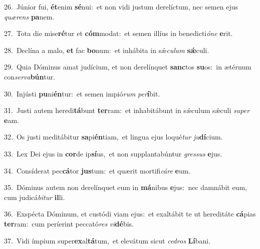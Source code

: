 {\numbfont\textcolor{\numbcolor}{26.}}~Júnior fui, \textbf{ét}\-enim \textbf{sé}\-nui:~\star et non vidi justum derelíctum, nec semen ejus \textit{quæ}\-\textit{rens} \textbf{pa}\-nem.\par
{\numbfont\textcolor{\numbcolor}{27.}}~Tota die mise\-\textbf{ré}\-tur et \textbf{cóm}\-modat:~\star et semen illíus in benedicti\-\textit{ó}\-\textit{ne} \textbf{e}\-rit.\par
{\numbfont\textcolor{\numbcolor}{28.}}~Declína a malo, \textbf{et} fac \textbf{bo}\-num:~\star et inhábita in sǽ\-\textit{cu}\-\textit{lum} \textbf{sǽ}\-culi.\par
{\numbfont\textcolor{\numbcolor}{29.}}~Quia Dóminus amat judícium, et non derelínquet \textbf{sanc}\-tos \textbf{su}\-os:~\star in ætérnum con\-\textit{ser}\-\textit{va}\textbf{bún}tur.\par
{\numbfont\textcolor{\numbcolor}{30.}}~Injústi \textbf{pu}\-ni\-\textbf{én}\-tur:~\star et semen impió\textit{rum} \textit{per}\-\textbf{í}bit.\par
{\numbfont\textcolor{\numbcolor}{31.}}~Justi autem heredi\-\textbf{tá}\-bunt \textbf{ter}\-ram:~\star et inhabitábunt in sǽculum sǽculi \textit{su}\-\textit{per} \textbf{e}\-am.\par
{\numbfont\textcolor{\numbcolor}{32.}}~Os justi meditábitur \textbf{sa}\-pi\-\textbf{én}\-tiam,~\star et lingua ejus loqué\textit{tur} \textit{ju}\-\textbf{dí}cium.\par
{\numbfont\textcolor{\numbcolor}{33.}}~Lex Dei ejus in \textbf{cor}\-de ip\-\textbf{sí}\-us,~\star et non supplantabúntur \textit{gres}\-\textit{sus} \textbf{e}\-jus.\par
{\numbfont\textcolor{\numbcolor}{34.}}~Consíderat pec\-\textbf{cá}\-tor \textbf{jus}\-tum:~\star et quærit mortifi\-\textit{cá}\-\textit{re} \textbf{e}\-um.\par
{\numbfont\textcolor{\numbcolor}{35.}}~Dóminus autem non derelínquet eum in \textbf{má}\-nibus \textbf{e}\-jus:~\star nec damnábit eum, cum judicá\-\textit{bi}\-\textit{tur} \textbf{il}\-li.\par
{\numbfont\textcolor{\numbcolor}{36.}}~Exspécta Dóminum, et custódi viam ejus:~\dagger et exaltábit te ut hereditáte \textbf{cá}\-pias \textbf{ter}\-ram:~\star cum períerint peccató\textit{res} \textit{vi}\-\textbf{dé}bis.\par
{\numbfont\textcolor{\numbcolor}{37.}}~Vidi ímpium super\-\textbf{ex}\-al\-\textbf{tá}\-tum,~\star et elevátum sicut \textit{ce}\-\textit{dros} \textbf{Lí}\-bani.\par

